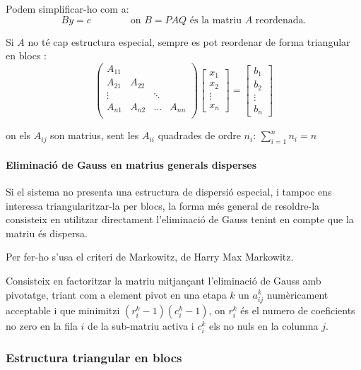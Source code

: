 \documentclass[11pt,a4paper,twoside]{report}
\begin{document}
Podem simplificar-ho com a:
\[By = c \qquad \qquad \text{on $B = PAQ$ és la matriu $A$ reordenada.} \]

Si $A$ no té cap estructura especial, sempre es pot reordenar de forma triangular en blocs : 
\[
\begin{pmatrix}
A_{11}	\\
A_{21}	&	A_{22}	\\
\vdots		&	& \ddots	&	\\
A_{n1}	&	A_{n2}	&	\dots	&	A_{nn}	\\
\end{pmatrix}
\begin{bmatrix}
x_1 \\ x_2 \\ \vdots \\ x_n
\end{bmatrix}
=
\begin{bmatrix}
b_1 \\ b_2 \\ \vdots \\ b_n
\end{bmatrix}
\]

on els $A_{ij}$ son matrius, sent les $A_{ii}$ quadrades de ordre $n_i$: $\sum_{i = 1}^n n_i = n$

\paragraph*{Eliminació de Gauss en matrius generals disperses} \mbox{}

Si el sistema no presenta una estructura de dispersió especial, i tampoc ens interessa triangularitzar-la per blocs, la forma més general de resoldre-la consisteix en utilitzar directament l'eliminació de Gauss tenint en compte que la matriu és dispersa.

Per fer-ho s'usa el criteri de Markowitz, de Harry Max Markowitz.

Consisteix en factoritzar la matriu mitjançant l'eliminació de Gauss amb pivotatge, triant com a element pivot en una etapa $k$ un $a_{ij}^k$ numèricament acceptable i que minimitzi $(r_i^k - 1)(c_i^k - 1)$, on $r_i^k$ és el numero de coeficients no zero en la fila $i$ de la sub-matriu activa i $c_i^k$ els no nuls en la columna $j$.

\subsubsection{Estructura triangular en blocs}
\end{document}

